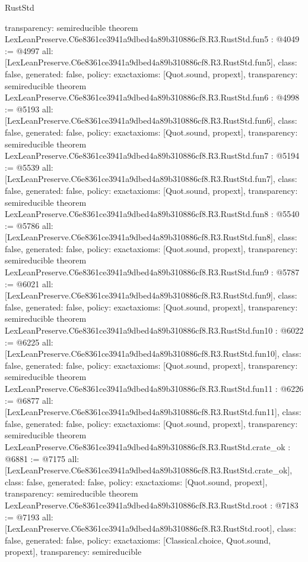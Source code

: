 \begin{lexlean}{RustStd}
\begin{coremodule}
{  transparency: semireducible
}
theorem LexLeanPreserve.C6e8361ce3941a9dbed4a89b310886cf8.R3.RustStd.fun5 : @4049 := @4997 {
  all: [LexLeanPreserve.C6e8361ce3941a9dbed4a89b310886cf8.R3.RustStd.fun5],
  class: false,
  generated: false,
  policy: exact{axioms: [Quot.sound, propext]},
  transparency: semireducible
}
theorem LexLeanPreserve.C6e8361ce3941a9dbed4a89b310886cf8.R3.RustStd.fun6 : @4998 := @5193 {
  all: [LexLeanPreserve.C6e8361ce3941a9dbed4a89b310886cf8.R3.RustStd.fun6],
  class: false,
  generated: false,
  policy: exact{axioms: [Quot.sound, propext]},
  transparency: semireducible
}
theorem LexLeanPreserve.C6e8361ce3941a9dbed4a89b310886cf8.R3.RustStd.fun7 : @5194 := @5539 {
  all: [LexLeanPreserve.C6e8361ce3941a9dbed4a89b310886cf8.R3.RustStd.fun7],
  class: false,
  generated: false,
  policy: exact{axioms: [Quot.sound, propext]},
  transparency: semireducible
}
theorem LexLeanPreserve.C6e8361ce3941a9dbed4a89b310886cf8.R3.RustStd.fun8 : @5540 := @5786 {
  all: [LexLeanPreserve.C6e8361ce3941a9dbed4a89b310886cf8.R3.RustStd.fun8],
  class: false,
  generated: false,
  policy: exact{axioms: [Quot.sound, propext]},
  transparency: semireducible
}
theorem LexLeanPreserve.C6e8361ce3941a9dbed4a89b310886cf8.R3.RustStd.fun9 : @5787 := @6021 {
  all: [LexLeanPreserve.C6e8361ce3941a9dbed4a89b310886cf8.R3.RustStd.fun9],
  class: false,
  generated: false,
  policy: exact{axioms: [Quot.sound, propext]},
  transparency: semireducible
}
theorem LexLeanPreserve.C6e8361ce3941a9dbed4a89b310886cf8.R3.RustStd.fun10 : @6022 := @6225 {
  all: [LexLeanPreserve.C6e8361ce3941a9dbed4a89b310886cf8.R3.RustStd.fun10],
  class: false,
  generated: false,
  policy: exact{axioms: [Quot.sound, propext]},
  transparency: semireducible
}
theorem LexLeanPreserve.C6e8361ce3941a9dbed4a89b310886cf8.R3.RustStd.fun11 : @6226 := @6877 {
  all: [LexLeanPreserve.C6e8361ce3941a9dbed4a89b310886cf8.R3.RustStd.fun11],
  class: false,
  generated: false,
  policy: exact{axioms: [Quot.sound, propext]},
  transparency: semireducible
}
theorem LexLeanPreserve.C6e8361ce3941a9dbed4a89b310886cf8.R3.RustStd.crate_ok : @6881 := @7175 {
  all: [LexLeanPreserve.C6e8361ce3941a9dbed4a89b310886cf8.R3.RustStd.crate_ok],
  class: false,
  generated: false,
  policy: exact{axioms: [Quot.sound, propext]},
  transparency: semireducible
}
theorem LexLeanPreserve.C6e8361ce3941a9dbed4a89b310886cf8.R3.RustStd.root : @7183 := @7193 {
  all: [LexLeanPreserve.C6e8361ce3941a9dbed4a89b310886cf8.R3.RustStd.root],
  class: false,
  generated: false,
  policy: exact{axioms: [Classical.choice, Quot.sound, propext]},
  transparency: semireducible
}


\end{coremodule}
\end{lexlean}
